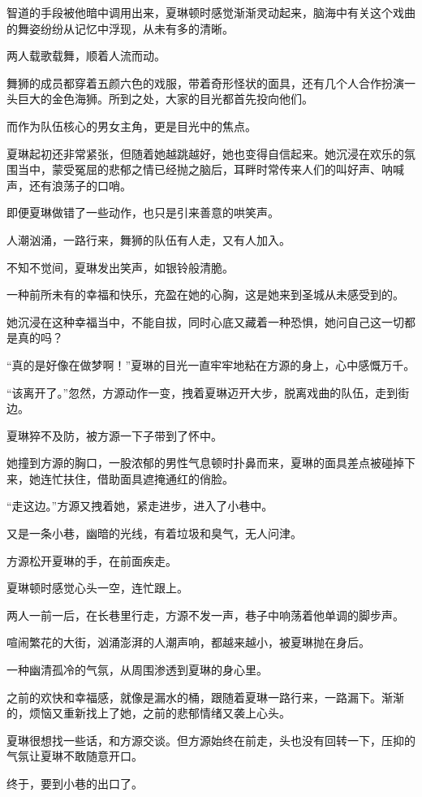 \begin{this_body}
智道的手段被他暗中调用出来，夏琳顿时感觉渐渐灵动起来，脑海中有关这个戏曲的舞姿纷纷从记忆中浮现，从未有多的清晰。

两人载歌载舞，顺着人流而动。

舞狮的成员都穿着五颜六色的戏服，带着奇形怪状的面具，还有几个人合作扮演一头巨大的金色海狮。所到之处，大家的目光都首先投向他们。

而作为队伍核心的男女主角，更是目光中的焦点。

夏琳起初还非常紧张，但随着她越跳越好，她也变得自信起来。她沉浸在欢乐的氛围当中，蒙受冤屈的悲郁之情已经抛之脑后，耳畔时常传来人们的叫好声、呐喊声，还有浪荡子的口哨。

即便夏琳做错了一些动作，也只是引来善意的哄笑声。

人潮汹涌，一路行来，舞狮的队伍有人走，又有人加入。

不知不觉间，夏琳发出笑声，如银铃般清脆。

一种前所未有的幸福和快乐，充盈在她的心胸，这是她来到圣城从未感受到的。

她沉浸在这种幸福当中，不能自拔，同时心底又藏着一种恐惧，她问自己这一切都是真的吗？

“真的是好像在做梦啊！”夏琳的目光一直牢牢地粘在方源的身上，心中感慨万千。

“该离开了。”忽然，方源动作一变，拽着夏琳迈开大步，脱离戏曲的队伍，走到街边。

夏琳猝不及防，被方源一下子带到了怀中。

她撞到方源的胸口，一股浓郁的男性气息顿时扑鼻而来，夏琳的面具差点被碰掉下来，她连忙扶住，借助面具遮掩通红的俏脸。

“走这边。”方源又拽着她，紧走进步，进入了小巷中。

又是一条小巷，幽暗的光线，有着垃圾和臭气，无人问津。

方源松开夏琳的手，在前面疾走。

夏琳顿时感觉心头一空，连忙跟上。

两人一前一后，在长巷里行走，方源不发一声，巷子中响荡着他单调的脚步声。

喧闹繁花的大街，汹涌澎湃的人潮声响，都越来越小，被夏琳抛在身后。

一种幽清孤冷的气氛，从周围渗透到夏琳的身心里。

之前的欢快和幸福感，就像是漏水的桶，跟随着夏琳一路行来，一路漏下。渐渐的，烦恼又重新找上了她，之前的悲郁情绪又袭上心头。

夏琳很想找一些话，和方源交谈。但方源始终在前走，头也没有回转一下，压抑的气氛让夏琳不敢随意开口。

终于，要到小巷的出口了。


\end{this_body}
